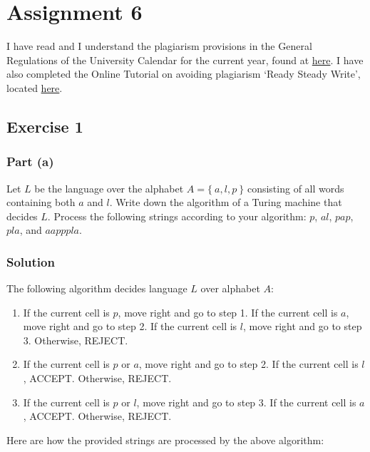 \documentclass[12pt]{article}
\begin{document}
\section*{Assignment 6}

I have read and I understand the plagiarism provisions in the General Regulations of the University Calendar for the current year, found at \href{http://www.tcd.ie/calendar}{here}.
I have also completed the Online Tutorial on avoiding plagiarism ‘Ready Steady Write’, located \href{http://tcd-ie.libguides.com/plagiarism/ready-steady-write}{here}.

\subsection*{Exercise 1}

\subsubsection*{Part (a)}

Let $L$ be the language over the alphabet $A = \{\ a, l, p\ \}$ consisting
of all words containing both $a$ and $l$. Write down the algorithm
of a Turing machine that decides $L$. Process the following strings
according to your algorithm: $p$, $al$, $pap$, $pla$, and $aapppla$.

\subsubsection*{Solution}

The following algorithm decides language $L$ over alphabet $A$:

\begin{enumerate}
	\item
	If the current cell is $p$, move right and go to step 1.
	If the current cell is $a$, move right and go to step 2.
	If the current cell is $l$, move right and go to step 3.
	Otherwise, REJECT.
	\item
	If the current cell is $p$ or $a$, move right and go to step 2.
	If the current cell is $l$, ACCEPT.
	Otherwise, REJECT.
	\item
	If the current cell is $p$ or $l$, move right and go to step 3.
	If the current cell is $a$, ACCEPT.
	Otherwise, REJECT.
\end{enumerate}

Here are how the provided strings are processed by the above algorithm:
\end{document}
